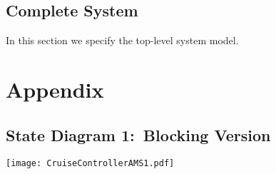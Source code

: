 \documentclass{article}
\begin{document}
\subsection{Complete System}

In this section we specify the top-level system model.
%


\newpage



%
%








\appendix

\section{Appendix}
\label{apx:asms}

\subsection{State Diagram 1:~Blocking Version}
\label{apx:asm1}

\begin{center}
\vspace{1ex}
\texttt{[image: CruiseControllerAMS1.pdf]}
\end{center}
\end{document}
